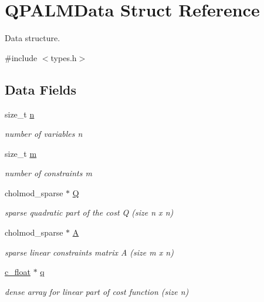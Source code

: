 \hypertarget{structQPALMData}{}\section{Q\+P\+A\+L\+M\+Data Struct Reference}
\label{structQPALMData}


Data structure.  




{\ttfamily \#include $<$types.\+h$>$}

\subsection*{Data Fields}
\begin{DoxyCompactItemize}
\item 
size\+\_\+t \mbox{\hyperlink{structQPALMData_a8a238460cbd7dd6571ac594b92a946cf}{n}}
\begin{DoxyCompactList}\small\item\em number of variables n \end{DoxyCompactList}\item 
size\+\_\+t \mbox{\hyperlink{structQPALMData_a1adf9ac40f4560e8d7d4b5b59efacb2e}{m}}
\begin{DoxyCompactList}\small\item\em number of constraints m \end{DoxyCompactList}\item 
cholmod\+\_\+sparse $\ast$ \mbox{\hyperlink{structQPALMData_a9b440bae03198195823e1e3f5154a611}{Q}}
\begin{DoxyCompactList}\small\item\em sparse quadratic part of the cost Q (size n x n) \end{DoxyCompactList}\item 
cholmod\+\_\+sparse $\ast$ \mbox{\hyperlink{structQPALMData_abba076ae970ced06cf4b9791b87fdeb4}{A}}
\begin{DoxyCompactList}\small\item\em sparse linear constraints matrix A (size m x n) \end{DoxyCompactList}\item 
\mbox{\hyperlink{global__opts_8h_a7f1a9fda95e52979658c20a0d134fb15}{c\+\_\+float}} $\ast$ \mbox{\hyperlink{structQPALMData_aa6775bd0b50250223ddd66115da68a12}{q}}
\begin{DoxyCompactList}\small\item\em dense array for linear part of cost function (size n) \end{DoxyCompactList}\item 

\end{DoxyCompactItemize}
